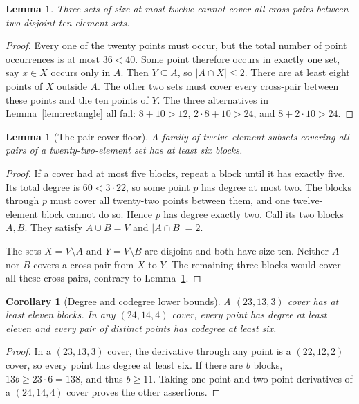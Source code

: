 \documentclass[11pt,letterpaper]{article}
\newtheorem{lemma}[theorem]{Lemma}
\newtheorem{corollary}[theorem]{Corollary}
\theoremstyle{definition}\newtheorem{definition}[theorem]{Definition}
\theoremstyle{remark}\newtheorem{remark}[theorem]{Remark}
\begin{document}
\begin{lemma}\label{lem:ten-grid}
Three sets of size at most twelve cannot cover all cross-pairs between two disjoint ten-element sets.
\end{lemma}
\begin{proof}
Every one of the twenty points must occur, but the total number of point occurrences is at most $36<40$. Some point therefore occurs in exactly one set, say $x\in X$ occurs only in $A$. Then $Y\subseteq A$, so $|A\cap X|\le2$. There are at least eight points of $X$ outside $A$. The other two sets must cover every cross-pair between these points and the ten points of $Y$. The three alternatives in Lemma~\ref{lem:rectangle} all fail: $8+10>12$, $2\cdot8+10>24$, and $8+2\cdot10>24$.
\end{proof}

\begin{lemma}[The pair-cover floor]\label{lem:pairfloor}
A family of twelve-element subsets covering all pairs of a twenty-two-element set has at least six blocks.
\end{lemma}
\begin{proof}
If a cover had at most five blocks, repeat a block until it has exactly five. Its total degree is $60<3\cdot22$, so some point $p$ has degree at most two. The blocks through $p$ must cover all twenty-two points between them, and one twelve-element block cannot do so. Hence $p$ has degree exactly two. Call its two blocks $A,B$. They satisfy $A\cup B=V$ and $|A\cap B|=2$.

The sets $X=V\setminus A$ and $Y=V\setminus B$ are disjoint and both have size ten. Neither $A$ nor $B$ covers a cross-pair from $X$ to $Y$. The remaining three blocks would cover all these cross-pairs, contrary to Lemma~\ref{lem:ten-grid}.\qedhere
\end{proof}

\begin{corollary}[Degree and codegree lower bounds]\label{cor:floors}
A $(23,13,3)$ cover has at least eleven blocks. In any $(24,14,4)$ cover, every point has degree at least eleven and every pair of distinct points has codegree at least six.
\end{corollary}
\begin{proof}
In a $(23,13,3)$ cover, the derivative through any point is a $(22,12,2)$ cover, so every point has degree at least six. If there are $b$ blocks, $13b\ge23\cdot6=138$, and thus $b\ge11$. Taking one-point and two-point derivatives of a $(24,14,4)$ cover proves the other assertions.
\end{proof}
\end{document}
